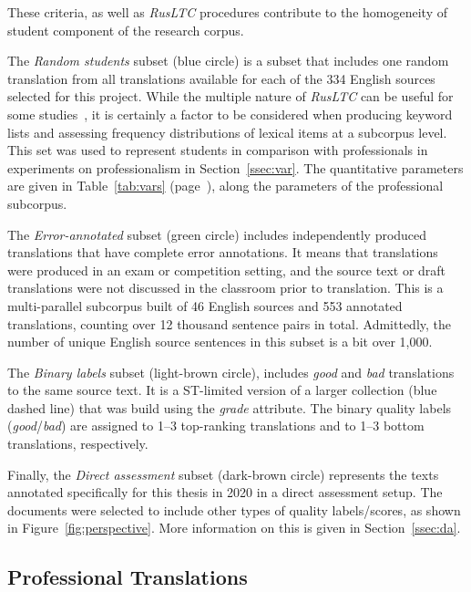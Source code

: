 These criteria, as well as \textit{RusLTC} procedures contribute to the homogeneity of student component of the research corpus. 

The \textit{Random students} subset (blue circle) is a subset that includes one random translation from all translations available for each of the 334 English sources selected for this project. While the multiple nature of \textit{RusLTC} can be useful for some studies~\cite[see][]{Castagnoli2009}, it is certainly a factor to be considered when producing keyword lists and assessing frequency distributions of lexical items at a subcorpus level. This set was used to represent students in comparison with professionals in experiments on professionalism in Section~\ref{ssec:var}. The quantitative parameters are given in Table~\ref{tab:vars} (page~\pageref{tab:vars}), along the parameters of the professional subcorpus.

The \textit{Error-annotated} subset (green circle) includes independently produced translations that have complete error annotations. It means that translations were produced in an exam or competition setting, and the source text or draft translations were not discussed in the classroom prior to translation. This is a multi-parallel subcorpus built of 46 English sources and 553 annotated translations, counting over 12 thousand sentence pairs in total. Admittedly, the number of unique English source sentences in this subset is a bit over 1,000.

The \textit{Binary labels} subset (light-brown circle), includes \textit{good} and \textit{bad} translations to the same source text. It is a ST-limited version of a larger collection (blue dashed line) that was build using the \textit{grade} attribute. The binary quality labels (\textit{good}/\textit{bad}) are assigned to 1--3 top-ranking translations and to 1--3 bottom translations, respectively.

Finally, the \textit{Direct assessment} subset (dark-brown circle) represents the texts annotated specifically for this thesis in 2020 in a direct assessment setup.  The documents were selected to include other types of quality labels/scores, as shown in Figure~\ref{fig:perspective}. More information on this is given in Section~\ref{ssec:da}.

\subsection{\label{ssec:mypro}Professional Translations}

